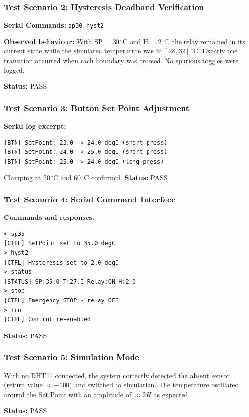 \documentclass[12pt]{article}
\begin{document}
\subsubsection*{Test Scenario 2: Hysteresis Deadband Verification}

\textbf{Serial Commands:} \texttt{sp30}, \texttt{hyst2}

\textbf{Observed behaviour:} With SP = 30\,$^{\circ}$C and H = 2\,$^{\circ}$C the
relay remained in its current state while the simulated temperature was in
$[28, 32]\,^{\circ}$C. Exactly one transition occurred when each boundary was
crossed. No spurious toggles were logged.

\textbf{Status:} PASS

\subsubsection*{Test Scenario 3: Button Set Point Adjustment}

\textbf{Serial log excerpt:}
\begin{verbatim}
[BTN] SetPoint: 23.0 -> 24.0 degC (short press)
[BTN] SetPoint: 24.0 -> 25.0 degC (short press)
[BTN] SetPoint: 25.0 -> 24.0 degC (long press)
\end{verbatim}
Clamping at 20\,$^{\circ}$C and 60\,$^{\circ}$C confirmed.
\textbf{Status:} PASS

\subsubsection*{Test Scenario 4: Serial Command Interface}

\textbf{Commands and responses:}
\begin{verbatim}
> sp35
[CTRL] SetPoint set to 35.0 degC
> hyst2
[CTRL] Hysteresis set to 2.0 degC
> status
[STATUS] SP:35.0 T:27.3 Relay:ON H:2.0
> stop
[CTRL] Emergency STOP - relay OFF
> run
[CTRL] Control re-enabled
\end{verbatim}
\textbf{Status:} PASS

\subsubsection*{Test Scenario 5: Simulation Mode}

With no DHT11 connected, the system correctly detected the absent sensor
(return value $< -100$) and switched to simulation. The temperature oscillated
around the Set Point with an amplitude of $\approx 2H$ as expected.

\textbf{Status:} PASS
\end{document}
